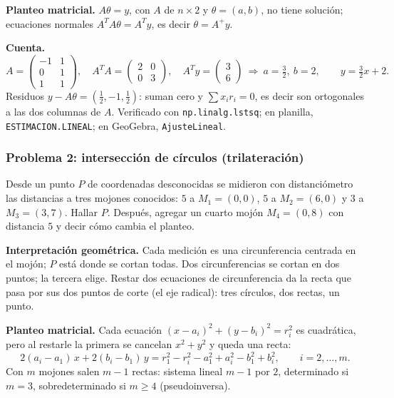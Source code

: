 \textbf{Planteo matricial.} \(A\theta=y\), con \(A\) de \(n\times2\) y
\(\theta=(a,b)\), no tiene solución; ecuaciones normales \(A^TA\theta=A^Ty\), es decir
\(\theta=A^{+}y\).

\textbf{Cuenta.}
\[
  A=\begin{pmatrix}-1&1\\0&1\\1&1\end{pmatrix},\quad
  A^TA=\begin{pmatrix}2&0\\0&3\end{pmatrix},\quad A^Ty=\begin{pmatrix}3\\6\end{pmatrix}
  \ \Rightarrow\ a=\tfrac32,\ b=2,\qquad y=\tfrac32x+2 .
\]
Residuos \(y-A\theta=(\tfrac12,-1,\tfrac12)\): suman cero y \(\sum x_ir_i=0\), es decir
son ortogonales a las dos columnas de \(A\). Verificado con \texttt{np.linalg.lstsq};
en planilla, \texttt{ESTIMACION.LINEAL}; en GeoGebra, \texttt{AjusteLineal}.

\subsubsection{Problema 2: intersección de círculos (trilateración)}

\begin{enunciado}[Enunciado]
Desde un punto \(P\) de coordenadas desconocidas se midieron con distanciómetro las
distancias a tres mojones conocidos: \(5\) a \(M_1=(0,0)\), \(5\) a \(M_2=(6,0)\) y \(3\)
a \(M_3=(3,7)\). Hallar \(P\). Después, agregar un cuarto mojón \(M_4=(0,8)\) con distancia
\(5\) y decir cómo cambia el planteo.
\end{enunciado}

\textbf{Interpretación geométrica.} Cada medición es una circunferencia centrada en el
mojón; \(P\) está donde se cortan todas. Dos circunferencias se cortan en dos puntos; la
tercera elige. Restar dos ecuaciones de circunferencia da la recta que pasa por sus dos
puntos de corte (el eje radical): tres círculos, dos rectas, un punto.

\textbf{Planteo matricial.} Cada ecuación \((x-a_i)^2+(y-b_i)^2=r_i^2\) es cuadrática,
pero al restarle la primera se cancelan \(x^2+y^2\) y queda una recta:
\[
  2(a_i-a_1)\,x+2(b_i-b_1)\,y=r_1^2-r_i^2-a_1^2+a_i^2-b_1^2+b_i^2 ,\qquad i=2,\dots,m .
\]
Con \(m\) mojones salen \(m-1\) rectas: sistema lineal \(m-1\) por \(2\), determinado si
\(m=3\), sobredeterminado si \(m\ge4\) (pseudoinversa).


